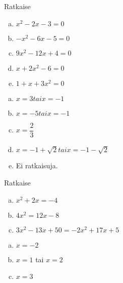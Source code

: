 \begin{tehtava}
    Ratkaise
    \begin{enumerate}[a)]
        \item $x^2 - 2x - 3 = 0$
        \item $-x^2 - 6x - 5 = 0$
        \item $9x^2 - 12x + 4 = 0$
        \item $x + 2x^2 - 6= 0$
        \item $1 + x + 3x^2= 0$
    \end{enumerate}
    \begin{vastaus}
        \begin{enumerate}[a)]
            \item $x = 3 tai x = -1$
            \item $x = -5 tai x = -1$
            \item $x = \dfrac{2}{3}$
            \item $x = -1 + \sqrt{2} tai x = -1 - \sqrt{2}$
            \item Ei ratkaisuja.
        \end{enumerate}
    \end{vastaus}
\end{tehtava}

\begin{tehtava}
    Ratkaise
    \begin{enumerate}[a)]
        \item $x^2 + 2x = -4$
        \item $4x^2 = 12x - 8$
        \item $3x^2 - 13x + 50 = -2x^2 + 17x + 5$
    \end{enumerate}
    \begin{vastaus}
        \begin{enumerate}[a)]
            \item $x = -2$
            \item $x = 1$ tai $x = 2$
            \item $x = 3$
        \end{enumerate}
    \end{vastaus}
\end{tehtava}


